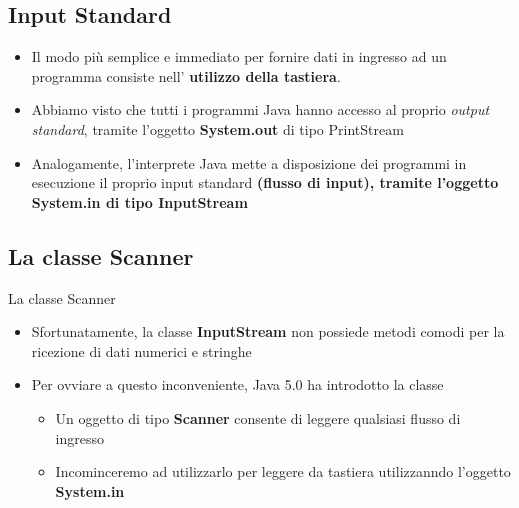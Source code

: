 \subsection*{Input Standard}
\begin{frame}
\begin{itemize}
\item Il modo più semplice e immediato per fornire dati in ingresso ad un programma consiste nell'
\textbf{utilizzo della tastiera}.
\item Abbiamo visto che tutti i programmi Java hanno accesso al proprio \textit{output standard}, tramite l’oggetto 
\textbf{System.out} di tipo \alert{PrintStream}
\item Analogamente, l'interprete Java mette a disposizione dei programmi in esecuzione il proprio input standard 
\textbf{(flusso di input), tramite l’oggetto System.in di tipo \alert{InputStream}}
\end{itemize}
\end{frame}

\subsection*{La classe Scanner}
\begin{frame}
\begin{block}{La classe Scanner}
\begin{itemize}
\item Sfortunatamente, la classe \textbf{InputStream} non possiede metodi comodi per la ricezione di dati numerici e 
stringhe
\item Per ovviare a questo inconveniente, Java 5.0 ha introdotto la classe 
\begin{itemize}
\item Un oggetto di tipo \textbf{Scanner} consente di leggere qualsiasi flusso di ingresso
\item Incominceremo ad utilizzarlo per leggere da tastiera utilizzanndo l'oggetto \textbf{System.in}
\end{itemize}
\end{itemize}
\end{block}
\end{frame}


